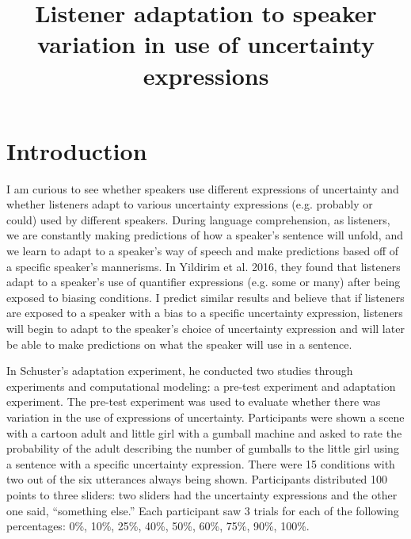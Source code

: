\documentclass{sp}          %
\title{Listener adaptation to speaker variation in use of uncertainty expressions}
\author{%
  \spauthor{Replication of adaptation experiment by Sebastian Schuster and Judith Degen
  Aleeza Yu\\ \today}
}
\begin{document}

\maketitle





\section{Introduction}

I am curious to see whether speakers use different expressions of uncertainty and whether listeners adapt to various uncertainty expressions (e.g. probably or could) used by different speakers. During language comprehension, as listeners, we are constantly making predictions of how a speaker’s sentence will unfold, and we learn to adapt to a speaker’s way of speech and make predictions based off of a specific speaker’s mannerisms. In Yildirim et al. 2016, they found that listeners adapt to a speaker’s use of quantifier expressions (e.g. some or many) after being exposed to biasing conditions. I predict similar results and believe that if listeners are exposed to a speaker with a bias to a specific uncertainty expression, listeners will begin to adapt to the speaker’s choice of uncertainty expression and will later be able to make predictions on what the speaker will use in a sentence.

In Schuster’s adaptation experiment, he conducted two studies through experiments and computational modeling: a pre-test experiment and adaptation experiment. The pre-test experiment was used to evaluate whether there was variation in the use of expressions of uncertainty. Participants were shown a scene with a cartoon adult and little girl with a gumball machine and asked to rate the probability of the adult describing the number of gumballs to the little girl using a sentence with a specific uncertainty expression. There were 15 conditions with two out of the six utterances always being shown. Participants distributed 100 points to three sliders: two sliders had the uncertainty expressions and the other one said, “something else.” Each participant saw 3 trials for each of the following percentages:
0\%, 10\%, 25\%, 40\%, 50\%, 60\%, 75\%, 90\%, 100\%. 
\end{document}
